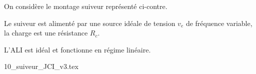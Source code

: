 \newpage








\hauteurLargeurCadreReponse		{8mm}{4cm}
\typeEntrainement				{} %
\initialisationEntrainement


\initialisationPartieGauche %
On considère le montage suiveur représenté ci-contre. 

Le suiveur est alimenté par une source idéale de tension \(v_{e}\) de fréquence variable, la charge est une résistance \(R_{c}\).

L’ALI est idéal et fonctionne en régime linéaire.
\initialisationPartieDroite %
\begin{center}
  \shorthandoff{!:}
  {10_suiveur_JCI_v3.tex}
  \shorthandon{!:}
\end{center}
\finalisationDuPartageDePage %


